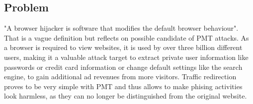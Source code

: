 \subsection{Problem}
"A browser hijacker is software that modifies the default browser behaviour"\cite{automatedspywarecollection}. That is a  vague definition but reflects on possible candidate of PMT attacks. As a browser is required to view websites, it is used by over three billion \cite{cia} different users, making it a valuable attack target to extract private user information like passwords or credit card information or change default settings like the search engine, to gain additional ad revenues from more visitors. Traffic redirection proves to be very simple with PMT and thus allows to make phising activities look harmless, as they can no longer be distinguished from the original website.